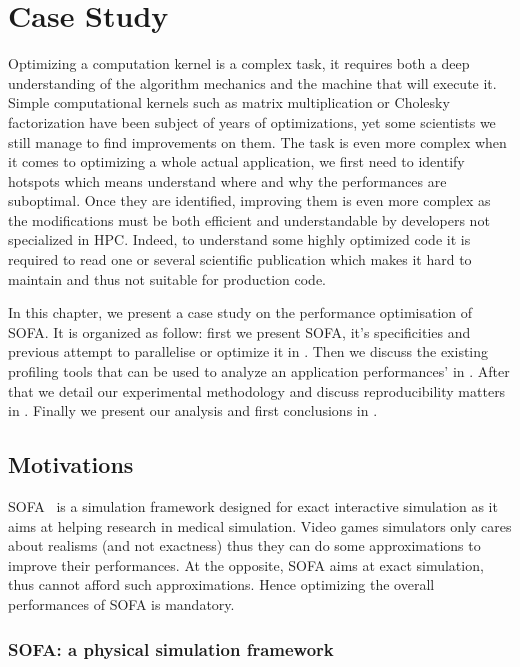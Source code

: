 \chapter{Case Study}
\label{chap:perf}

Optimizing a computation kernel is a complex task, it requires both a deep
understanding of the algorithm mechanics and the machine that will execute it.
Simple computational kernels such as matrix multiplication or Cholesky
factorization have been subject of years of optimizations, yet some scientists
we still manage to find improvements on them. The task is even more complex
when it comes to optimizing a whole actual application, we first need to
identify hotspots which means understand where and why the performances are
suboptimal. Once they are identified, improving them is even more complex as
the modifications must be both efficient and understandable by developers not
specialized in \gls{HPC}. Indeed, to understand some highly optimized code it
is required to read one or several scientific publication which makes it hard
to maintain and thus not suitable for production code.

In this chapter, we present a case study on the performance optimisation of
\gls{SOFA}. It is organized as follow: first we present \gls{SOFA}, it's
specificities and previous attempt to parallelise or optimize it in
. Then we discuss the existing profiling tools that can be
used to analyze an application performances' in .  After that
we detail our experimental methodology and discuss reproducibility matters in
. Finally we present our analysis and first conclusions in
.

\section{Motivations}
\label{sec:motivations}

\gls{SOFA}~\cite{Allard07SOFA} is a simulation framework designed for exact
interactive simulation as it aims at helping research in medical simulation.
Video games simulators only cares about realisms (and not exactness) thus they
can do some approximations to improve their performances. At the opposite,
\gls{SOFA} aims at exact simulation, thus cannot afford such approximations.
Hence optimizing the overall performances of \gls{SOFA} is mandatory.


\subsection{SOFA: a physical simulation framework}

